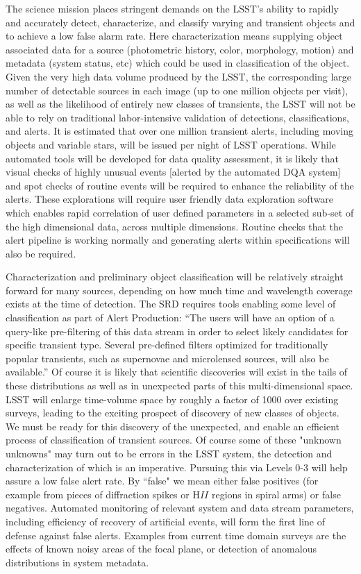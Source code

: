 \documentclass[SE,toc,lsstdraft]{lsstdoc}
\begin{document}
The science mission places stringent demands on the LSST's ability to rapidly and accurately detect, characterize, and classify varying and transient objects and to achieve a low false alarm rate.  Here characterization means supplying object associated data for a source (photometric history, color, morphology, motion) and metadata (system status, etc) which could be used in classification of the object.  Given the very high data volume  produced by the LSST, the corresponding large number of detectable sources in each  image (up to one million objects per visit), as well as the  likelihood of entirely new classes of transients, the LSST will not be able  to rely on traditional labor-intensive validation of detections,  classifications, and alerts.  It is estimated that over one million transient alerts, including moving objects and variable stars, will be issued per night of LSST operations. While automated tools will be developed for data quality assessment, it is likely that visual checks of highly unusual events [alerted by the automated DQA system] and spot checks of routine events will be required to enhance the reliability of the alerts. These explorations will require user friendly data exploration software which enables rapid correlation of user defined parameters in a selected sub-set of the high dimensional data, across multiple dimensions. Routine checks that the alert pipeline is working normally and generating alerts within specifications will also be required.

Characterization and preliminary object classification will be relatively straight forward for many sources, depending on how much time and wavelength coverage exists at the time of detection. The SRD requires tools enabling some level of classification as part of Alert Production:  ``The users will have an option of a query-like pre-filtering of this data stream in order to select likely candidates for specific transient type. Several pre-defined filters optimized for traditionally popular transients, such as supernovae and microlensed sources, will also be available.''  Of course it is likely that scientific discoveries will exist in the tails of these distributions as well as in unexpected parts of this multi-dimensional space.  LSST will enlarge time-volume space by roughly a factor of 1000 over existing surveys, leading to the exciting prospect of discovery of new classes of objects.  We must be ready for this discovery of the unexpected, and enable an efficient process of classification of transient sources.  Of course some of these "unknown unknowns" may turn out to be errors in the LSST system, the detection and characterization of which is an imperative.  Pursuing this via Levels 0-3 will help assure a low false alert rate. By ``false" we mean either false positives (for example from pieces of diffraction spikes or H$II$ regions in spiral arms) or false negatives. Automated monitoring of relevant system and data stream parameters, including efficiency of recovery of artificial events, will form the first line of defense against false alerts. Examples from current time domain surveys are the effects of known noisy areas of the focal plane, or detection of anomalous distributions in system metadata.
\end{document}
